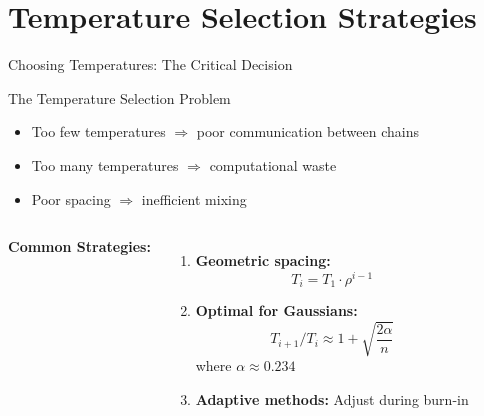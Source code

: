 \documentclass[aspectratio=169]{beamer}
\begin{document}
\section{Temperature Selection Strategies}

\begin{frame}{Choosing Temperatures: The Critical Decision}
\begin{block}{The Temperature Selection Problem}
\begin{itemize}
    \item Too few temperatures $\Rightarrow$ poor communication between chains
    \item Too many temperatures $\Rightarrow$ computational waste
    \item Poor spacing $\Rightarrow$ inefficient mixing
\end{itemize}
\end{block}

\begin{columns}
\textbf{Common Strategies:}
\begin{enumerate}
    \item \textbf{Geometric spacing:}
    $$T_i = T_1 \cdot \rho^{i-1}$$
    
    \item \textbf{Optimal for Gaussians:}
    $$T_{i+1}/T_i \approx 1 + \sqrt{\frac{2\alpha}{n}}$$
    where $\alpha \approx 0.234$
    
    \item \textbf{Adaptive methods:}
    Adjust during burn-in
\end{enumerate}

\end{columns}
\end{frame}
\end{document}
